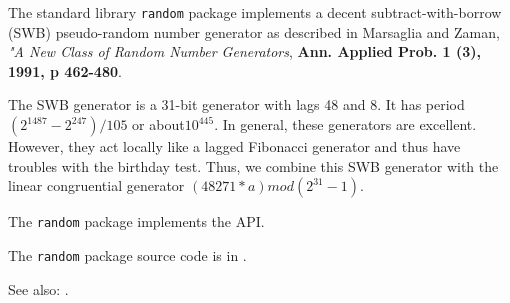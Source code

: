 
The standard library {\tt random} package implements a decent subtract-with-borrow {\sc (SWB)} pseudo-random 
number generator 
as described in Marsaglia and Zaman, {\it "A New Class of Random Number 
Generators}, {\bf Ann. Applied Prob. 1 (3), 1991, p 462-480}.

The SWB generator is a 31-bit generator with lags 48 and 8. It has period 
$(2^1487 - 2^247)/105$ or about$ 10^445$. In general, these generators are 
excellent. However, they act locally like a lagged Fibonacci generator 
and thus have troubles with the birthday test. Thus, we combine this SWB 
generator with the linear congruential generator $(48271*a)mod (2^31-1)$.

The {\tt random} package implements the  API.

The {\tt random} package source code is in .

See also:  .




